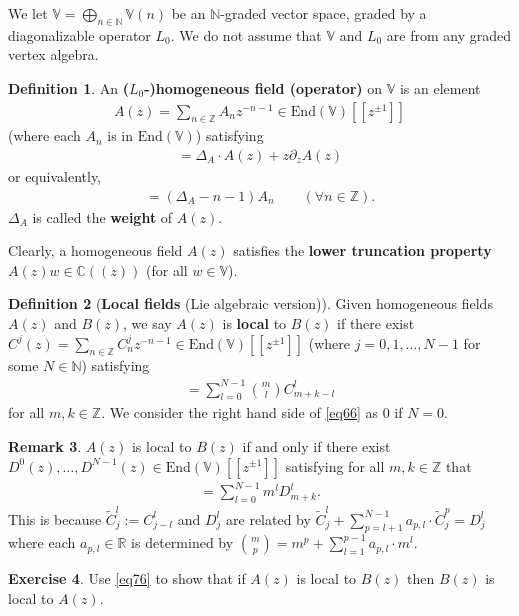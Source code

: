 \documentclass[11pt,b5paper,notitlepage]{article}
\theoremstyle{definition}
\newtheorem{df}{Definition}[section]
\newtheorem{exe}[df]{Exercise}
\newtheorem{rem}[df]{Remark}
\theoremstyle{plain}
\newcommand{\wtd}{\widetilde}
\newcommand{\End}{\mathrm{End}} %
\newcommand{\Vbb}{\mathbb V}
\newcommand{\Cbb}{\mathbb C}
\newcommand{\Nbb}{\mathbb N}
\newcommand{\Zbb}{\mathbb Z}
\newcommand{\Rbb}{\mathbb R}
\numberwithin{equation}{section}
\begin{document}
We let $\Vbb=\bigoplus_{n\in\Nbb}\Vbb(n)$ be an $\Nbb$-graded vector space, graded by a diagonalizable operator $L_0$. We do not assume that $\Vbb$ and $L_0$ are  from any graded vertex algebra. 
\begin{df}\label{lb61}
An \textbf{($L_0$-)homogeneous field (operator)} on $\Vbb$ is an element
\begin{align*}
A(z)=\sum_{n\in\Zbb} A_nz^{-n-1}\in\End(\Vbb)[[z^{\pm1}]]	
\end{align*}
(where each $A_n$ is in $\End(\Vbb)$) satisfying
\begin{align}
[L_0,A(z)]=\Delta_A\cdot A(z)+z\partial_z A(z)	
\end{align}
or equivalently,
\begin{align}
[L_0,A_n]=(\Delta_A-n-1)A_n\qquad(\forall n\in\Zbb)	.
\end{align}
$\Delta_A$ is called the \textbf{weight} of $A(z)$.
\end{df}


Clearly, a homogeneous field $A(z)$ satisfies the \textbf{lower truncation property} $A(z)w\in\Cbb((z))$ (for all $w\in\Vbb$).


\begin{df}[\textbf{Local fields} (Lie algebraic version)]\label{lb59}
Given homogeneous fields $A(z)$ and $B(z)$, we say $A(z)$ is  \textbf{local} to $B(z)$ if there exist $C^j(z)=\sum_{n\in\Zbb}C^j_nz^{-n-1}\in\End(\Vbb)[[z^{\pm1}]]$ (where $j=0,1,\dots,N-1$ for some $N\in\Nbb$) satisfying
\begin{align}
[A_m,B_k]=\sum_{l=0}^{N-1}{m\choose l}C^l_{m+k-l}	\label{eq66}
\end{align}
for all $m,k\in\Zbb$.  We consider the right hand side of \eqref{eq66} as $0$ if $N=0$.
\end{df}


\begin{rem}\label{lb60}
$A(z)$ is local to $B(z)$ if and only if there exist $D^0(z),\dots,D^{N-1}(z)\in\End(\Vbb)[[z^{\pm1}]]$ satisfying for all $m,k\in\Zbb$ that
\begin{align}
[A_m,B_k]=\sum_{l=0}^{N-1}m^lD^l_{m+k}.	\label{eq76}
\end{align}
This is because $\wtd C^l_j:=C^l_{j-l}$ and $D^l_j$ are related by   $\wtd C^l_j+\sum_{p=l+1}^{N-1}a_{p,l}\cdot\wtd C^{p}_j=D^l_j$ where each $a_{p,l}\in\Rbb$ is determined by ${m\choose p}=m^p+\sum_{l=1}^{p-1}a_{p,l}\cdot m^{l}$.
\end{rem}

\begin{exe}
Use \eqref{eq76} to show that if $A(z)$ is local to $B(z)$ then $B(z)$ is local to $A(z)$.
\end{exe}
\end{document}
